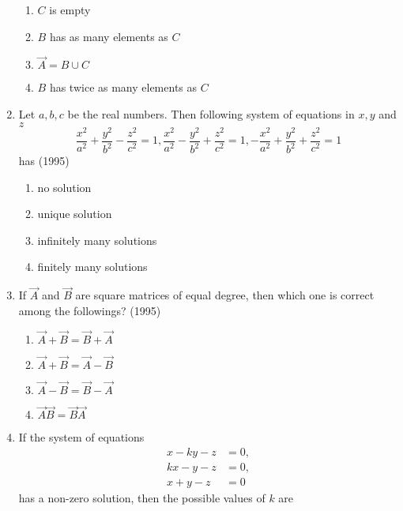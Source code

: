\begin{enumerate}[label=\thesubsection.\arabic*.,ref=\thesubsection.\theenumi]
\begin{multicols}{2}
\begin{enumerate}
				\item $C$ is empty
				\item $B$ has as many elements as $C$
				\item $\vec{A} = B \cup C$
				\item $B$ has twice as many elements as $C$
			\end{enumerate}
		\end{multicols}
	\item Let $a, b, c$ be the real numbers. Then following system of
		equations in $x, y$ and $z$ 
		$$
		\frac{x^2}{a^2} + \frac{y^2}{b^2} - \frac{z^2}{c^2} = 1	,
		\frac{x^2}{a^2} - \frac{y^2}{b^2} + \frac{z^2}{c^2} = 1	,
		-\frac{x^2}{a^2} + \frac{y^2}{b^2} + \frac{z^2}{c^2} = 1
		$$ has	
		\hfill (1995)

		\begin{multicols}{2}
			\begin{enumerate}
				\item no solution
				\item unique solution
				\columnbreak
				\item infinitely many solutions
				\item finitely many solutions
			\end{enumerate}
		\end{multicols}
%
	\item If $\vec{A}$ and $\vec{B}$ are square matrices of equal degree, then which
		one is correct among the followings?
		\hfill (1995)
%
		\begin{multicols}{2}
			\begin{enumerate}
				\item $\vec{A} + \vec{B} = \vec{B} + \vec{A}$
				\item $\vec{A} + \vec{B} = \vec{A} - \vec{B}$
				\columnbreak
				\item $\vec{A} - \vec{B} = \vec{B} - \vec{A}$
				\item $\vec{A}\vec{B} = \vec{B}\vec{A}$
			\end{enumerate}
		\end{multicols}
\item If the system of equations
    \begin{align*}
	    x-ky-z&=0 ,\\ kx-y-z&=0, \\ x+y-z&=0
    \end{align*} has a non-zero  solution,  then the possible values of $k$ are 
    \hfill{}
    \begin{multicols}{4}

\end{multicols}
\end{enumerate}
